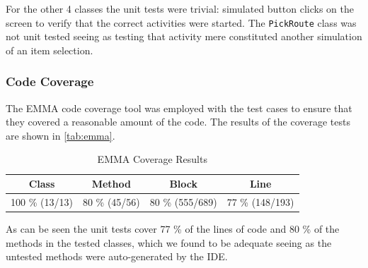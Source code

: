 For the other 4 classes the unit tests were trivial: simulated button clicks on the screen to verify that the correct activities were started. The \texttt{PickRoute} class was not unit tested seeing as testing that activity mere constituted another simulation of an item selection.

\subsubsection{Code Coverage}
The EMMA code coverage tool was employed with the test cases to ensure that they covered a reasonable amount of the code. The results of the coverage tests are shown in \autoref{tab:emma}.

\begin{table}[!ht]
	\centering
	\begin{tabular}{| c | c | c | c |}
		\hline
		\textbf{Class} & \textbf{Method} & \textbf{Block} & \textbf{Line} \\ \hline
		100 \% (13/13) & 80 \% (45/56) & 80 \% (555/689) & 77 \% (148/193) \\
		\hline
	\end{tabular}
	\caption{EMMA Coverage Results}
	\label{tab:emma}
\end{table}

As can be seen the unit tests cover 77 \% of the lines of code and 80 \% of the methods in the tested classes, which we found to be adequate seeing as the untested methods were auto-generated by the \ac{IDE}.

